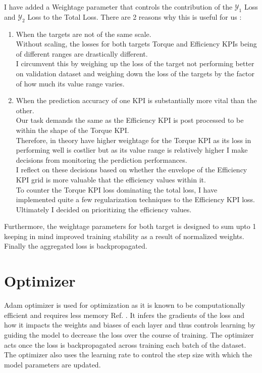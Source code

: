 \documentclass{report} %
\begin{document}
I have added a Weightage parameter that controls the contribution of the $\mathcal{Y}_1$ Loss and $\mathcal{Y}_2$ Loss to the Total Loss. There are 2 reasons why this is useful for us :
\begin{enumerate}[nosep]
    \item  When the targets are not of the same scale. \\
    Without scaling, the losses for both targets Torque and Efficiency \ac{KPI}s being of different ranges are drastically different.\\
    I circumvent this by weighing up the loss of the target not performing better on validation dataset and weighing down the loss of the 
    targets by the factor of how much its value range varies.
    \item When the prediction accuracy of one \ac{KPI} is substantially more vital than the other. \\
    Our task demands the same as the Efficiency \ac{KPI} is post processed to be within the shape of the Torque \ac{KPI}. \\
    Therefore, in theory have higher weightage for the Torque \ac{KPI} as its loss in performing well is costlier but as its value range is relatively higher I make decisions from monitoring the perdiction performances.\\
    I reflect on these decisions based on whether the envelope of the Efficiency \ac{KPI} grid is more valuable that the efficiency values within it.\\
    To counter the Torque \ac{KPI} loss dominating the total loss, I have implemented quite a few regularization techniques to the Efficiency \ac{KPI} loss.\\
    Ultimately I decided on prioritizing the efficiency values.
\end{enumerate}
Furthermore, the weightage parameters for both target is designed to sum upto 1 keeping in mind improved training stability as a result of normalized weights. \\
Finally the aggregated loss is backpropagated.

\section{Optimizer}\label{sec:Optimizer}

Adam optimizer is used for optimization as it is known to be computationally efficient and requires less memory Ref. \cite{ADAM-2017}. 
It infers the gradients of the loss and how it impacts the weights and biases of each layer and thus controls learning by guiding the model to decrease the loss over the course of training. 
The optimizer acts once the loss is backpropagated across training each batch of the dataset.
The optimizer also uses the learning rate to control the step size with which the model parameters are updated.
\end{document}
